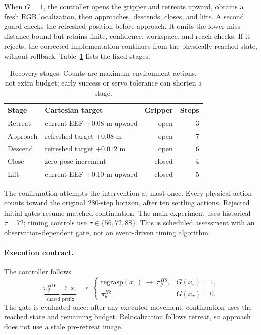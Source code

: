 \documentclass{article}
\begin{document}
When $G=1$, the controller opens the gripper and retreats upward, obtains
a fresh RGB localization, then approaches, descends, closes, and lifts.
A second guard checks the refreshed position before approach.
It omits the lower miss-distance bound but retains finite, confidence,
workspace, and reach checks. If it rejects, the corrected implementation
continues from the physically reached state, without rollback.
Table~\ref{tab:primitive} lists the fixed stages.

\begin{table}[t]
\caption{Recovery stages. Counts are maximum environment actions, not extra
budget; early success or servo tolerance can shorten a stage.}
\label{tab:primitive}
\centering\small
\begin{tabular}{llrr}
\toprule
Stage & Cartesian target & Gripper & Steps\\
\midrule
Retreat & current EEF $+0.08$ m upward & open & 3\\
Approach & refreshed target $+0.08$ m & open & 7\\
Descend & refreshed target $+0.012$ m & open & 6\\
Close & zero pose increment & closed & 4\\
Lift & current EEF $+0.10$ m upward & closed & 5\\
\bottomrule
\end{tabular}
\end{table}

The confirmation attempts the intervention at most once.
Every physical action counts toward the original 280-step horizon, after
ten settling actions. Rejected initial gates resume matched continuation.
The main experiment uses historical $\tau=72$; timing controls use
$\tau\in\{56,72,88\}$. This is scheduled assessment with an observation-dependent
gate, not an event-driven timing algorithm.

\paragraph{Execution contract.}
The controller follows
\begin{equation}
\underbrace{\pi_\theta^{H16}\ \longrightarrow\ x_\tau}_{\text{shared prefix}}
\ \longrightarrow\
\begin{cases}
\text{regrasp}(x_\tau)\ \longrightarrow\ \pi_\theta^{H8},&G(x_\tau)=1,\\
\pi_\theta^{H8},&G(x_\tau)=0.
\end{cases}
\label{eq:controller}
\end{equation}
The gate is evaluated once; after any executed movement, continuation uses
the reached state and remaining budget. Relocalization follows retreat,
so approach does not use a stale pre-retreat image.
\end{document}

